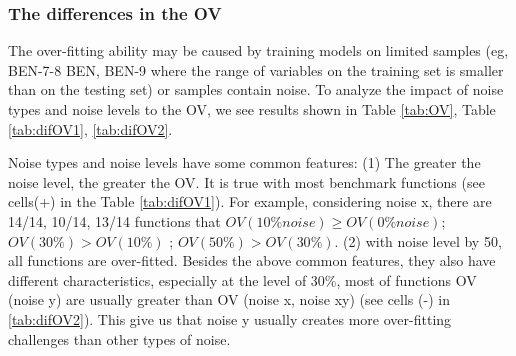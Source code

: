 \subsubsection {The differences in the OV}
\label{AnaDiffOV}
The over-fitting ability may be caused by training models on limited samples (eg, BEN-7-8 BEN, BEN-9 where the range of variables on the training set is smaller than on the testing set) or samples contain noise. To analyze the impact of noise types and noise levels to the OV, we see results shown in Table \ref{tab:OV}, Table \ref{tab:difOV1}, \ref{tab:difOV2}. \par
Noise types and noise levels have some common features: (1) The greater the noise level, the greater the OV. It is true with most benchmark functions (see cells(+) in the Table \ref{tab:difOV1}). For example, considering noise x, there are 14/14, 10/14, 13/14 functions that $OV (10\% noise) \ge OV (0\% noise)$; $OV(30\%) > OV(10\%)$ ; $OV(50\%) > OV(30\%)$. (2) with noise level by 50, all functions are over-fitted. Besides the above common features, they also have different characteristics, especially at the level of 30\%, most of functions OV (noise y) are usually greater than OV (noise x, noise xy) (see cells (-) in \ref{tab:difOV2}). This give us that noise y usually creates more over-fitting challenges than other types of noise.\par
